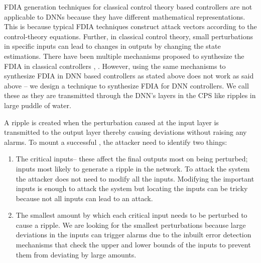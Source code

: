 FDIA generation techniques for classical control theory based controllers \cite{10.1145/1952982.1952995} are not applicable to DNNs because they have different mathematical representations. This is because typical FDIA techniques construct attack vectors according to the control-theory equations. %
Further, in classical control theory, small perturbations in specific inputs can lead to changes in outputs by changing the state estimations. There have been multiple mechanisms proposed to synthesize the FDIA in classical controllers  \cite{e3f0020abba24d4389aff937fe8bcdd5},  \cite{10.1145/1952982.1952995}.  
However, using the same mechanisms to synthesize FDIA in DNN  based controllers as stated above does not work as said above %
-- we design a technique to synthesize FDIA for DNN controllers. We call these \attack as they are transmitted through the DNN's layers in the CPS like ripples in large puddle of water. %

A ripple is created when the perturbation caused at the input layer is transmitted to the output layer thereby causing deviations without raising any alarms. 
To mount a successful \attack, the attacker need to identify two things: 
\begin{enumerate}
	\item The critical inputs-- these affect the final outputs most on being perturbed; inputs most likely to generate a ripple in the network. To attack the system the attacker does not need to modify all the inputs. Modifying the important inputs is enough to attack the system but locating the inputs can be tricky because not all inputs can lead to an attack. 
	\item The smallest amount by which each critical input needs to be perturbed to cause a ripple. We are looking for the smallest perturbations because large deviations in the inputs can trigger alarms due to the inbuilt error detection mechanisms that 
	check the upper and lower bounds of the inputs to prevent them from deviating by large amounts.
\end{enumerate}

